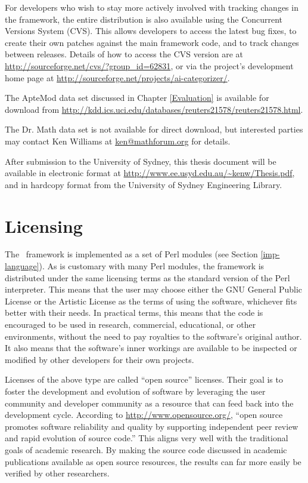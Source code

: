 For developers who wish to stay more actively involved with tracking
changes in the framework, the entire distribution is also available
using the Concurrent Versions System (CVS).  This allows developers to
access the latest bug fixes, to create their own patches against the
main framework code, and to track changes between releases.  Details
of how to access the CVS version are at
\url{http://sourceforge.net/cvs/?group_id=62831}, or via the project's
development home page at
\url{http://sourceforge.net/projects/ai-categorizer/}.

The ApteMod data set discussed in Chapter \ref{Evaluation} is
available for download from
\url{http://kdd.ics.uci.edu/databases/reuters21578/reuters21578.html}.

The Dr. Math data set is not available for direct download, but
interested parties may contact Ken Williams at \url{ken@mathforum.org}
for details.

After submission to the University of Sydney, this thesis document
will be available in electronic format at
\url{http://www.ee.usyd.edu.au/~kenw/Thesis.pdf}, and in hardcopy
format from the University of Sydney Engineering Library.

\section*{Licensing}

The \aicat\ framework is implemented as a set of Perl modules (see
Section \ref{imp-language}).  As is customary with many Perl modules,
the framework is distributed under the same licensing terms as the
standard version of the Perl interpreter.  This means that the user
may choose either the GNU General Public License or the Artistic
License as the terms of using the software, whichever fits better with
their needs.  In practical terms, this means that the code is
encouraged to be used in research, commercial, educational, or other
environments, without the need to pay royalties to the software's
original author.  It also means that the software's inner workings are
available to be inspected or modified by other developers for their
own projects.

Licenses of the above type are called ``open source'' licenses.  Their
goal is to foster the development and evolution of software by
leveraging the user community and developer community as a resource
that can feed back into the development cycle.  According to
\url{http://www.opensource.org/}, ``open source promotes software
reliability and quality by supporting independent peer review and
rapid evolution of source code.''  This aligns very well with the
traditional goals of academic research.  By making the source code
discussed in academic publications available as open source resources, the
results can far more easily be verified by other researchers.


